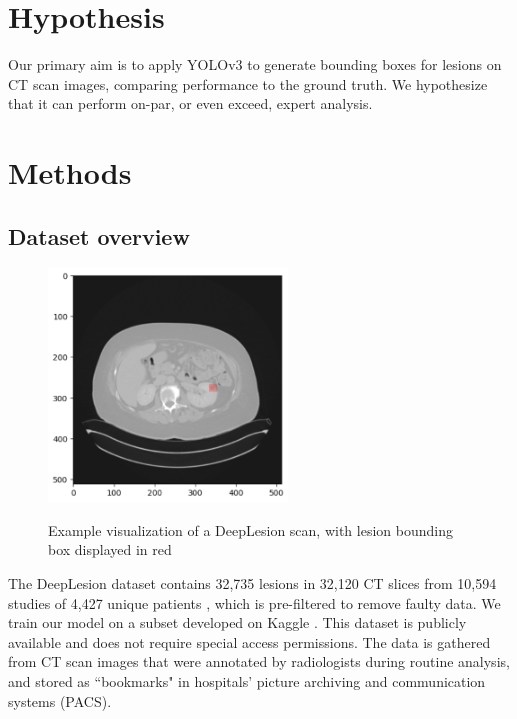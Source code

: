 \section{Hypothesis}
Our primary aim is to apply YOLOv3 to generate bounding boxes for lesions on CT scan images, comparing performance to the ground truth. We hypothesize that it can perform on-par, or even exceed, expert analysis.

\section{Methods}
\subsection{Dataset overview}

\begin{figure}
 \begin{center}
 \includegraphics[width=2.5in]{images/example_scan.png}\\
 \caption{Example visualization of a DeepLesion scan, with lesion bounding box displayed in red}\label{example_scan}
 \end{center}
\end{figure}


The DeepLesion dataset contains 32,735 lesions in 32,120 CT slices from 10,594 studies of 4,427 unique patients \cite{deeplesion}, which is pre-filtered to remove faulty data. We train our model on a subset developed on Kaggle \cite{kaggle}. This dataset is publicly available and does not require special access permissions. The data is gathered from CT scan images that were annotated by radiologists during routine analysis, and stored as ``bookmarks" in hospitals' picture archiving and communication systems (PACS).  

